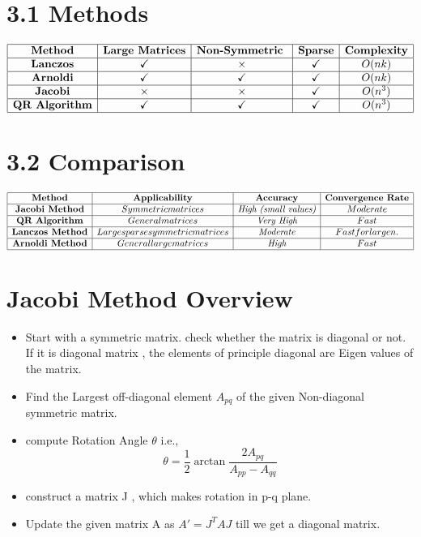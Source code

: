 \documentclass[12pt]{article}
\begin{document}
\section*{3.1 Methods}
\[
\begin{array}{|c|c|c|c|c|}
\hline
\textbf{Method} & \textbf{Large Matrices} & \textbf{Non-Symmetric } & \textbf{Sparse} & \textbf{Complexity} \\ \hline
\textbf{Lanczos} & \checkmark & \times & \checkmark & O(nk) \\ \hline
\textbf{Arnoldi} & \checkmark & \checkmark & \checkmark & O(nk) \\ \hline
\textbf{Jacobi} & \times & \times & \checkmark & O(n^3) \\ \hline
\textbf{QR Algorithm} & \checkmark & \checkmark & \checkmark & O(n^3) \\ \hline
\end{array}
\]

\section*{3.2 Comparison}
\[
\begin{array}{|c|c|c|c|}
\hline
\textbf{Method} & \textbf{Applicability} & \textbf{Accuracy} & \textbf{Convergence Rate}  \\ \hline
\textbf{Jacobi Method} & Symmetric matrices & \textit{High (small values)} & Moderate  \\ \hline
\textbf{QR Algorithm} & General matrices & \textit{Very High} & Fast  \\ \hline
\textbf{Lanczos Method} & Large sparse symmetric matrices & \textit{Moderate} & Fast for large n . \\ \hline
\textbf{Arnoldi Method} & General large matrices & \textit{High} & Fast  \\ \hline
\end{array}
\]


\section{Jacobi Method Overview}
\begin{itemize}
    \item Start with a symmetric matrix. check whether the matrix is diagonal or not. If it is diagonal matrix , the elements of principle diagonal are Eigen values of the matrix.
    \item Find the Largest off-diagonal element $A_{pq}$ of the given Non-diagonal symmetric matrix.
    \item compute Rotation Angle $\theta$ i.e.,
    \begin{equation*}
        \theta=\frac{1}{2}\arctan{{\frac{2A_{pq}}{A_{pp}-A_{qq}}}}
    \end{equation*}
    \item construct a matrix J , which makes rotation in p-q plane.
    \item Update the given matrix A as $A'=J^TAJ$ till we get a diagonal matrix.
\end{itemize}
\end{document}
